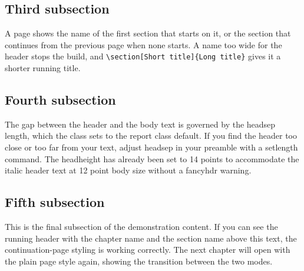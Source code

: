 \subsection{Third subsection}
A page shows the name of the first section that starts on it, or the section that continues from the previous page when none starts. A name too wide for the header stops the build, and \texttt{\textbackslash section[Short title]\{Long title\}} gives it a shorter running title.

\subsection{Fourth subsection}
The gap between the header and the body text is governed by the headsep length, which the class sets to the report class default. If you find the header too close or too far from your text, adjust headsep in your preamble with a setlength command. The headheight has already been set to 14 points to accommodate the italic header text at 12 point body size without a fancyhdr warning.

\subsection{Fifth subsection}
This is the final subsection of the demonstration content. If you can see the running header with the chapter name and the section name above this text, the continuation-page styling is working correctly. The next chapter will open with the plain page style again, showing the transition between the two modes.
